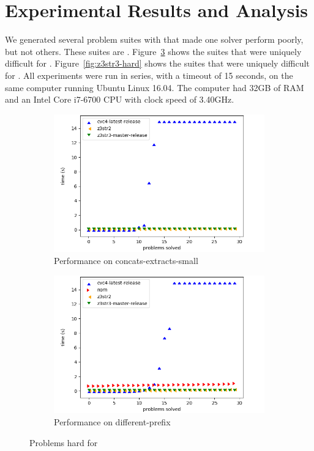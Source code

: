 \section{Experimental Results and Analysis}
\label{sec:data}

We generated several problem suites with \fuzzer{} that made one
solver perform poorly, but not others. These suites are
\theSuites{}. Figure~\ref{fig:cvc-hard} shows the suites that were
uniquely difficult for \cvc{}. Figure~\ref{fig:z3str3-hard} shows the
suites that were uniquely difficult for \us{}. All experiments were
run in series, with a timeout of 15 seconds, on the same computer running
Ubuntu Linux 16.04. The computer had 32GB of RAM and an
Intel\textregistered{} Core\texttrademark{} i7-6700 CPU with clock speed
of 3.40GHz.

\begin{figure}[h]
    \begin{subfigure}{.5\textwidth}
        \includegraphics[width=\textwidth]{data/graphs/concats-extracts-small.png}
        \caption{Performance on concats-extracts-small}
        \label{fig:concats-extracts-small}
    \end{subfigure}
    \begin{subfigure}{.5\textwidth}
        \includegraphics[width=\textwidth]{data/graphs/different-prefix.png}
        \caption{Performance on different-prefix}
        \label{fig:different-prefix}
    \end{subfigure}
    \caption{Problems hard for \cvc{}}
    \label{fig:cvc-hard}


\end{figure}

